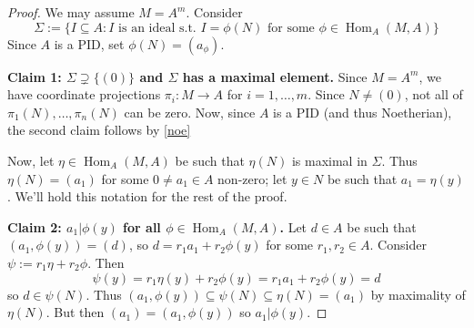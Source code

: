 \documentclass[11pt, a4paper]{memoir}
\theoremstyle{change}
\theoremstyle{plain}
\theoremstyle{nonumberplain}
\newtheorem{proof}{Proof}
\DeclareMathOperator{\Hom}{Hom}
\numberwithin{equation}{section}
\begin{document}
\begin{proof}
    We may assume $M=A^m$.
    Consider
    \begin{equation*}
        \Sigma:=\{I\subseteq A:I\text{ is an ideal s.t. }I=\phi(N)\text{ for some }\phi\in\Hom_A(M,A)\}
    \end{equation*}
    Since $A$ is a PID, set $\phi(N)=(a_\phi)$.

    \textbf{Claim 1: $\Sigma\supsetneq\{(0)\}$ and $\Sigma$ has a maximal element.}
    Since $M=A^m$, we have coordinate projections $\pi_i:M\to A$ for $i=1,\ldots,m$.
    Since $N\neq(0)$, not all of $\pi_1(N),\ldots,\pi_n(N)$ can be zero.
    Now, since $A$ is a PID (and thus Noetherian), the second claim follows by \cref{noe}

    Now, let $\eta\in\Hom_A(M,A)$ be such that $\eta(N)$ is maximal in $\Sigma$.
    Thus $\eta(N)=(a_1)$ for some $0\neq a_1\in A$ non-zero; let $y\in N$ be such that $a_1=\eta(y)$.
    We'll hold this notation for the rest of the proof.

    \textbf{Claim 2: $a_1|\phi(y)$ for all $\phi\in\Hom_A(M,A)$.}
    Let $d\in A$ be such that $(a_1,\phi(y))=(d)$, so $d=r_1a_1+r_2\phi(y)$ for some $r_1,r_2\in A$.
    Consider $\psi:=r_1\eta+r_2\phi$.
    Then
    \begin{equation*}
        \psi(y)=r_1\eta(y)+r_2\phi(y)=r_1a_1+r_2\phi(y)=d
    \end{equation*}
    so $d\in \psi(N)$.
    Thus $(a_1,\phi(y))\subseteq\psi(N)\subseteq\eta(N)=(a_1)$ by maximality of $\eta(N)$.
    But then $(a_1)=(a_1,\phi(y))$ so $a_1|\phi(y)$.


\end{proof}
\end{document}

